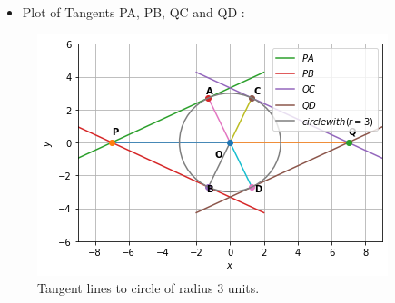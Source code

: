 \documentclass[journal,12pt,twocolumn]{IEEEtran}
\begin{document}
\begin{itemize}
\item Plot of Tangents PA, PB, QC and QD :
\end{itemize}
\begin{figure}[ht]
    \centering
    \includegraphics[width=\columnwidth]{FIGURE3.png}
    \caption{Tangent lines to circle of radius 3 units.}
    \label{fig:Tangent lines to circle of radius 3 units.}
\end{figure}    
\end{document}
